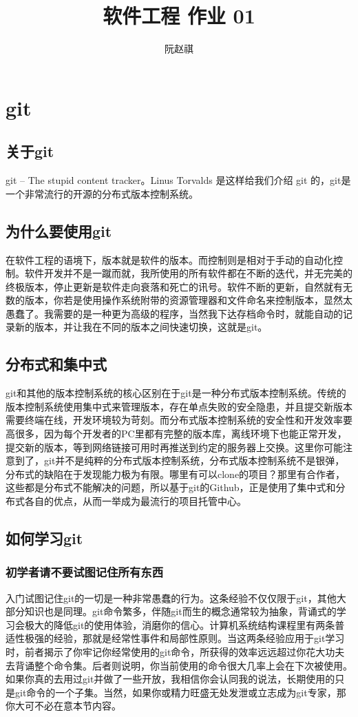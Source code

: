 \documentclass{article}
\title{软件工程 作业 01}
\author{阮赵祺}
\begin{document}
	
	\maketitle
	\section{git}
	\subsection{关于git}
	git --	The stupid content tracker。Linus Torvalds 是这样给我们介绍 git 的，git是一个非常流行的开源的分布式版本控制系统。
	\subsection{为什么要使用git}
	在软件工程的语境下，版本就是软件的版本。而控制则是相对于手动的自动化控制。软件开发并不是一蹴而就，我所使用的所有软件都在不断的迭代，并无完美的终极版本，停止更新是软件走向衰落和死亡的讯号。软件不断的更新，自然就有无数的版本，你若是使用操作系统附带的资源管理器和文件命名来控制版本，显然太愚蠢了。我需要的是一种更为高级的程序，当然我下达存档命令时，就能自动的记录新的版本，并让我在不同的版本之间快速切换，这就是git。
	\subsection{分布式和集中式}
	git和其他的版本控制系统的核心区别在于git是一种分布式版本控制系统。传统的版本控制系统使用集中式来管理版本，存在单点失败的安全隐患，并且提交新版本需要终端在线，开发环境较为苛刻。而分布式版本控制系统的安全性和开发效率要高很多，因为每个开发者的PC里都有完整的版本库，离线环境下也能正常开发，提交新的版本，等到网络链接可用时再推送到约定的服务器上交换。这里你可能注意到了，git并不是纯粹的分布式版本控制系统，分布式版本控制系统不是银弹，分布式的缺陷在于发现能力极为有限。哪里有可以clone的项目？那里有合作者，这些都是分布式不能解决的问题，所以基于git的Github，正是使用了集中式和分布式各自的优点，从而一举成为最流行的项目托管中心。
	\subsection{如何学习git}
	\subsubsection{初学者请不要试图记住所有东西}
	入门试图记住git的一切是一种非常愚蠢的行为。这条经验不仅仅限于git，其他大部分知识也是同理。git命令繁多，伴随git而生的概念通常较为抽象，背诵式的学习会极大的降低git的使用体验，消磨你的信心。计算机系统结构课程里有两条普适性极强的经验，那就是经常性事件和局部性原则。当这两条经验应用于git学习时，前者揭示了你牢记你经常使用的git命令，所获得的效率远远超过你花大功夫去背诵整个命令集。后者则说明，你当前使用的命令很大几率上会在下次被使用。如果你真的去用过git并做了一些开放，我相信你会认同我的说法，长期使用的只是git命令的一个子集。当然，如果你或精力旺盛无处发泄或立志成为git专家，那你大可不必在意本节内容。
\end{document}
